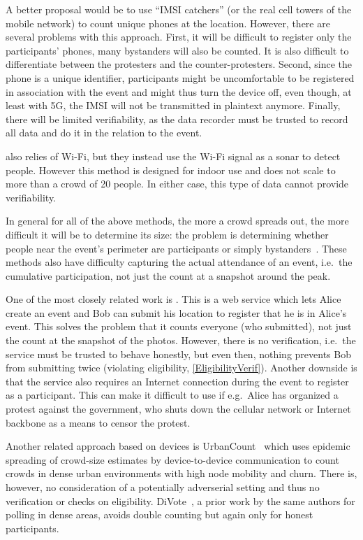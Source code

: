 A better proposal would be to use \enquote{IMSI catchers} (or the real cell 
towers of the mobile network) to count unique phones at the location.
However, there are several problems with this approach.
First, it will be difficult to register only the participants' phones, many 
bystanders will also be counted.
It is also difficult to differentiate between the protesters and the 
counter-protesters.
Second, since the phone is a unique identifier, participants might be 
uncomfortable to be registered in association with the event and might thus 
turn the device off, even though, at least with 5G, the IMSI will not be
transmitted in plaintext anymore. %
Finally, there will be limited verifiability, as the data recorder must be 
trusted to record all data and do it in the relation to the event.

 also relies of Wi-Fi, but they instead use the Wi-Fi 
signal as a sonar to detect people.
However this method is designed for indoor use and does not scale to more than 
a crowd of 20 people.
In either case, this type of data cannot provide verifiability.

In general for all of the above methods, the more a crowd spreads out, the more
difficult it will be to determine its size:
the problem is determining whether people near the event's perimeter are 
participants or simply bystanders~\cite{HowToEstimateCrowdSize}.
These methods also have difficulty capturing the actual attendance of an event,
i.e.\ the cumulative participation, not just the count at a snapshot around the 
peak.

One of the most closely related work is \citet{CrowdCount}.
This is a web service which lets Alice create an event and Bob can submit his 
location to register that he is in Alice's event.
This solves the problem that it counts everyone (who submitted), not just the 
count at the snapshot of the photos.
However, there is no verification, i.e.\ the service must be trusted to behave 
honestly, but even then, nothing prevents Bob from submitting twice (violating 
eligibility, \cref{EligibilityVerif}).
Another downside is that the service also requires an Internet connection 
during the event to register as a participant.
This can make it difficult to use if e.g.\ Alice has organized a protest 
against the government, who shuts down the cellular network or Internet 
backbone as a means to censor the protest.

Another related approach based on devices is UrbanCount~\cite{UrbanCount} which
uses epidemic spreading of crowd-size estimates by device-to-device
communication to count crowds in dense urban environments with high
node mobility and churn. There is, however, no consideration of a potentially
adverserial setting and thus no verification or checks on
eligibility. DiVote~\cite{DiVote}, a prior work by the same authors for
polling in dense areas, avoids double counting but again only for
honest participants.

